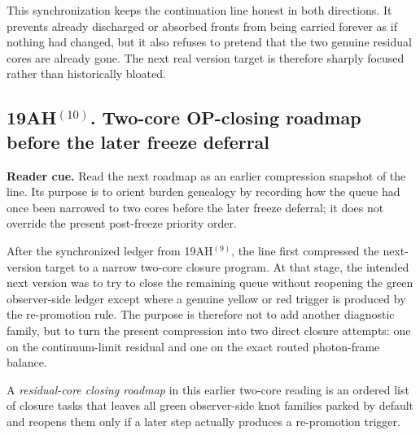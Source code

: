 \begin{remark}
This synchronization keeps the continuation line honest in both directions. It prevents already discharged or absorbed fronts from being carried forever as if nothing had changed, but it also refuses to pretend that the two genuine residual cores are already gone. The next real version target is therefore sharply focused rather than historically bloated.
\end{remark}

\subsection*{19AH$^{(10)}$. Two-core OP-closing roadmap before the later freeze deferral}
\noindent\textbf{Reader cue.} Read the next roadmap as an earlier compression snapshot of the line. Its purpose is to orient burden genealogy by recording how the queue had once been narrowed to two cores before the later freeze deferral; it does not override the present post-freeze priority order.

After the synchronized ledger from 19AH$^{(9)}$, the line first compressed the next-version target to a narrow two-core closure program. At that stage, the intended next version was to try to close the remaining queue without reopening the green observer-side ledger except where a genuine yellow or red trigger is produced by the re-promotion rule. The purpose is therefore not to add another diagnostic family, but to turn the present compression into two direct closure attempts: one on the continuum-limit residual and one on the exact routed photon-frame balance.

\begin{definition}
A \emph{residual-core closing roadmap} in this earlier two-core reading is an ordered list of closure tasks that leaves all green observer-side knot families parked by default and reopens them only if a later step actually produces a re-promotion trigger.
\end{definition}

